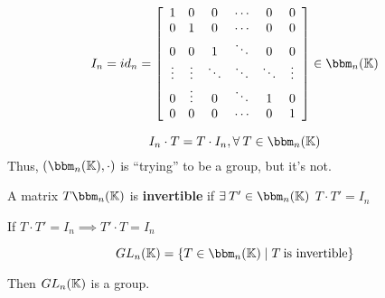 \begin{definition} 
    \[
        I_n = id_n = \left[
            \begin{array}{cccccc}
                1      & 0      & 0      & \cdots & 0      & 0      \\
                0      & 1      & 0      & \cdots & 0      & 0      \\
                0      & 0      & 1      & \ddots & 0      & 0      \\
                \vdots & \vdots & \ddots & \ddots & \ddots & \vdots \\
                0      & \vdots & 0      & \ddots & 1      & 0      \\
                0      & 0      & 0      & \cdots & 0      & 1      \\
            \end{array}
            \right] \in \bbm_n(\bbk)
    \]
\end{definition}

\begin{observe}
    \[
        I_n \cdot T = T \cdot I_n, \forall T \in \bbm_n(\bbk)
    \]
    Thus, \((\bbm_n(\bbk), \cdot)\) is ``trying'' to be a group, but it's not.
\end{observe}

\begin{definition} 
    A matrix \(T \bbm_n(\bbk)\) is \textbf{invertible} if \(\exists T' \in \bbm_n(\bbk)\) \st \(T \cdot T' = I_n\)
\end{definition}
\begin{exercise}
    If \(T \cdot T' = I_n \implies T' \cdot T = I_n\)
\end{exercise}

\begin{definition} 
    \[GL_n(\bbk) = \{T\in \bbm_n(\bbk) \mid T \:\text{is invertible}\}\]
\end{definition}

\begin{remark}
    Then \(GL_n(\mathbb{K})\) is a group.
\end{remark}

